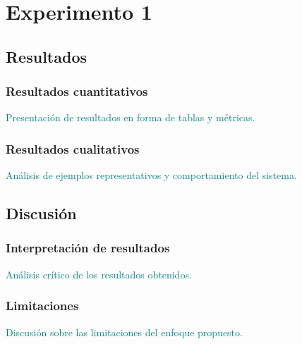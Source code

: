 \section{Experimento 1}
\subsection{Resultados}
\subsubsection{Resultados cuantitativos}
\textcolor{teal}{Presentación de resultados en forma de tablas y métricas.}
\subsubsection{Resultados cualitativos}
\textcolor{teal}{Análisis de ejemplos representativos y comportamiento del sistema.}

\subsection{Discusión}
\subsubsection{Interpretación de resultados}
\textcolor{teal}{Análisis crítico de los resultados obtenidos.}
\subsubsection{Limitaciones}
\textcolor{teal}{Discusión sobre las limitaciones del enfoque propuesto.}
